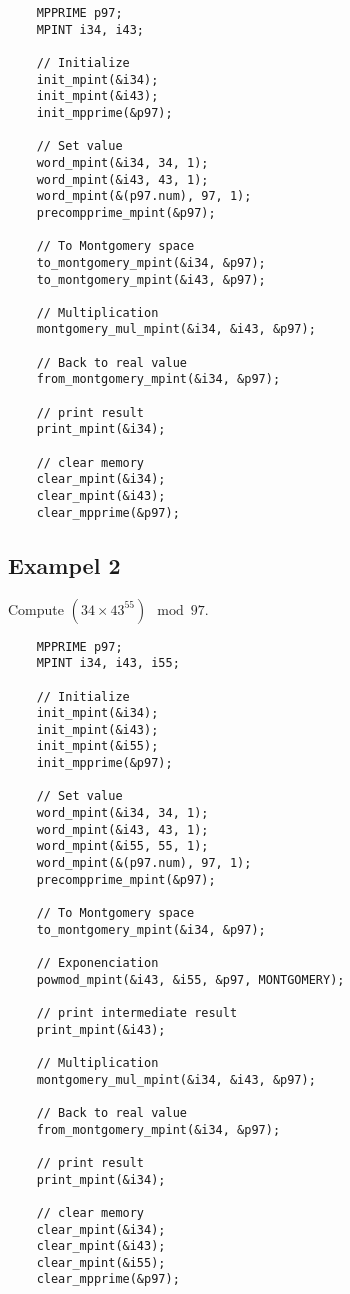 \documentclass[10pt,a4paper]{article}
\begin{document}
  \begin{lstlisting}
    MPPRIME p97;
    MPINT i34, i43;
    
    // Initialize
    init_mpint(&i34);
    init_mpint(&i43);
    init_mpprime(&p97);
    
    // Set value
    word_mpint(&i34, 34, 1);
    word_mpint(&i43, 43, 1);
    word_mpint(&(p97.num), 97, 1);
    precompprime_mpint(&p97);
    
    // To Montgomery space
    to_montgomery_mpint(&i34, &p97);
    to_montgomery_mpint(&i43, &p97);
    
    // Multiplication
    montgomery_mul_mpint(&i34, &i43, &p97);
    
    // Back to real value
    from_montgomery_mpint(&i34, &p97);
    
    // print result
    print_mpint(&i34);
    
    // clear memory
    clear_mpint(&i34);
    clear_mpint(&i43);
    clear_mpprime(&p97);
  \end{lstlisting}
  
  \subsection{Exampel 2} \label{example2}
  Compute $(34 \times 43^{55})\mod 97$.
  
  \begin{lstlisting}
    MPPRIME p97;
    MPINT i34, i43, i55;
    
    // Initialize
    init_mpint(&i34);
    init_mpint(&i43);
    init_mpint(&i55);
    init_mpprime(&p97);
    
    // Set value
    word_mpint(&i34, 34, 1);
    word_mpint(&i43, 43, 1);
    word_mpint(&i55, 55, 1);
    word_mpint(&(p97.num), 97, 1);
    precompprime_mpint(&p97);
    
    // To Montgomery space
    to_montgomery_mpint(&i34, &p97);
    
    // Exponenciation
    powmod_mpint(&i43, &i55, &p97, MONTGOMERY);
    
    // print intermediate result
    print_mpint(&i43);
    
    // Multiplication
    montgomery_mul_mpint(&i34, &i43, &p97);
    
    // Back to real value
    from_montgomery_mpint(&i34, &p97);
    
    // print result
    print_mpint(&i34);
    
    // clear memory
    clear_mpint(&i34);
    clear_mpint(&i43);
    clear_mpint(&i55);
    clear_mpprime(&p97);
  \end{lstlisting}
  
\end{document}
